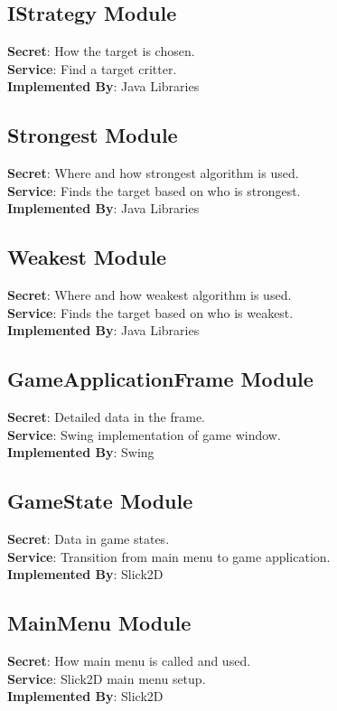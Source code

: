 \documentclass[12,english]{article}
\begin{document}
    \subsection{IStrategy Module}
	\textbf{Secret}: How the target is chosen. \\
	\textbf{Service}:  Find a target critter.  \\ 
	\textbf{Implemented By}: Java Libraries\\
	
	\subsection{Strongest Module}
	\textbf{Secret}: Where and how strongest algorithm is used. \\
	\textbf{Service}:  Finds the target based on who is strongest.  \\ 
	\textbf{Implemented By}: Java Libraries\\
	
	\subsection{Weakest Module}
	\textbf{Secret}: Where and how weakest algorithm is used. \\
	\textbf{Service}:  Finds the target based on who is weakest.  \\ 
	\textbf{Implemented By}: Java Libraries\\
	
	\subsection{GameApplicationFrame Module}
	\textbf{Secret}: Detailed data in the frame. \\
	\textbf{Service}: Swing implementation of game window.  \\ 
	\textbf{Implemented By}: Swing\\
	
	\subsection{GameState Module}
	\textbf{Secret}: Data in game states. \\
	\textbf{Service}: Transition from main menu to game application.  \\ 
	\textbf{Implemented By}: Slick2D\\
	
	\subsection{MainMenu Module}
	\textbf{Secret}: How main menu is called and used. \\
	\textbf{Service}: Slick2D main menu setup.  \\ 
	\textbf{Implemented By}: Slick2D\\
	
\end{document}
